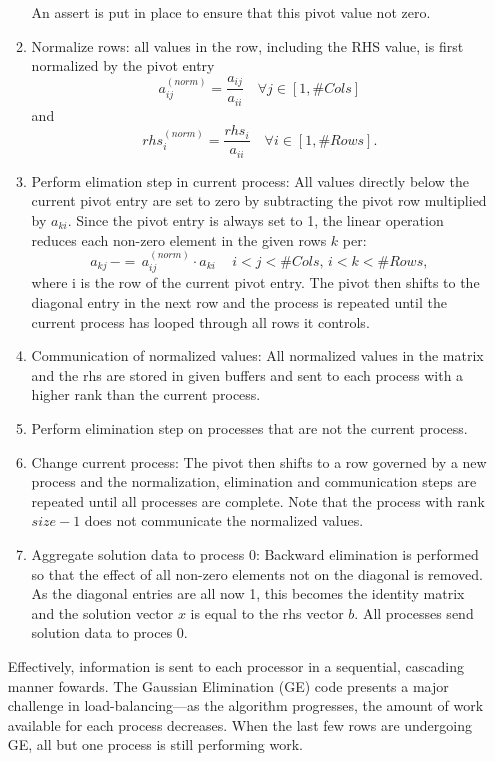 \begin{enumerate}
\begin{enumerate}
An assert is put in place to ensure that this pivot value not zero. 
\item Normalize rows: all values in the row, including the RHS value, is first normalized by the pivot entry 
\begin{equation*}
	a_{ij}^{(norm)} = \frac{a_{ij}}{a_{ii}} \quad \forall j \in [1, \# Cols]
\end{equation*}
and 
\begin{equation*}
rhs_{i}^{(norm)} = \frac{rhs_{i}}{a_{ii}} \quad \forall i \in [1, \# Rows].
\end{equation*}

\item Perform elimation step in current process: All values directly below the current pivot entry are set to zero by subtracting the pivot row multiplied by $a_{ki}$. Since the pivot entry is always set to 1, the linear operation reduces each non-zero element in the given rows $k$ per:
\begin{equation*}
	a_{kj} \,-=\, a_{ij}^{(norm)} \cdot a_{ki} \quad \,i < j < \# Cols, \, i < k < \# Rows,
\end{equation*}
where i is the row of the current pivot entry. The pivot then shifts to the diagonal entry in the next row and the process is repeated until the current process has looped through all rows it controls.
\item Communication of normalized values: All normalized values in the matrix and the rhs are stored in given buffers and sent to each process with a higher rank than the current process. 
\item Perform elimination step on processes that are not the current process.
\item Change current process: The pivot then shifts to a row governed by a new process and the normalization, elimination and communication steps are repeated until all processes are complete. Note that the process with rank $size-1$ does not communicate the normalized values.
\item Aggregate solution data to process 0: Backward elimination is performed so that the effect of all non-zero elements not on the diagonal is removed. As the diagonal entries are all now 1, this becomes the identity matrix and the solution vector $x$ is equal to the rhs vector $b$. All processes send solution data to proces 0.
\end{enumerate}

Effectively, information is sent to each processor in a sequential, cascading manner fowards. The Gaussian Elimination (GE) code presents a major challenge in load-balancing---as the algorithm progresses, the amount of work available for each process decreases. When the last few rows are undergoing GE, all but one process is still performing work. 


\end{enumerate}
